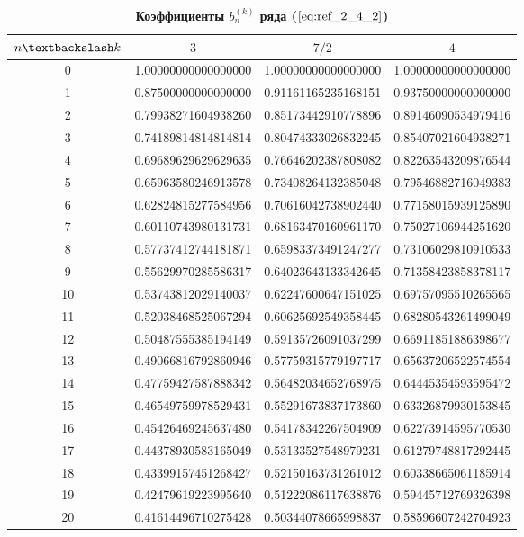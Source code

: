 \begin{table}[]
\caption{\textbf{Коэффициенты $b_n^{(k)}$ ряда ($\ref{eq:ref_2_4_2}$)}}
\begin{center}
\begin{tabular}{|c|c|c|c|}
\hline
$n \textbackslash k$ & $3$ & $7/2$ & $4$ \\
\hline
0  & 1.00000000000000000 & 1.00000000000000000 & 1.00000000000000000 \\
1  & 0.87500000000000000 & 0.91161165235168151 & 0.93750000000000000 \\
2  & 0.79938271604938260 & 0.85173442910778896 & 0.89146090534979416 \\
3  & 0.74189814814814814 & 0.80474333026832245 & 0.85407021604938271 \\
4  & 0.69689629629629635 & 0.76646202387808082 & 0.82263543209876544 \\
5  & 0.65963580246913578 & 0.73408264132385048 & 0.79546882716049383 \\
6  & 0.62824815277584956 & 0.70616042738902440 & 0.77158015939125890 \\
7  & 0.60110743980131731 & 0.68163470160961170 & 0.75027106944251620 \\
8  & 0.57737412744181871 & 0.65983373491247277 & 0.73106029810910533 \\
9  & 0.55629970285586317 & 0.64023643133342645 & 0.71358423858378117 \\
10 & 0.53743812029140037 & 0.62247600647151025 & 0.69757095510265565 \\
11 & 0.52038468525067294 & 0.60625692549358445 & 0.68280543261499049 \\
12 & 0.50487555385194149 & 0.59135726091037299 & 0.66911851886398677 \\
13 & 0.49066816792860946 & 0.57759315779197717 & 0.65637206522574554 \\
14 & 0.47759427587888342 & 0.56482034652768975 & 0.64445354593595472 \\
15 & 0.46549759978529431 & 0.55291673837173860 & 0.63326879930153845 \\
16 & 0.45426469245637480 & 0.54178342267504909 & 0.62273914595770530 \\
17 & 0.44378930583165049 & 0.53133527548979231 & 0.61279748817292445 \\
18 & 0.43399157451268427 & 0.52150163731261012 & 0.60338665061185914 \\
19 & 0.42479619223995640 & 0.51222086117638876 & 0.59445712769326398 \\
20 & 0.41614496710275428 & 0.50344078665998837 & 0.58596607242704923 \\

\end{tabular}
\end{center}
\end{table}
